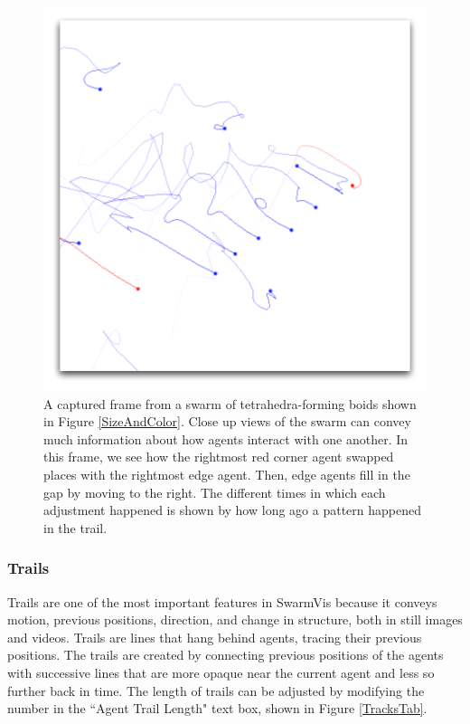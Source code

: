 \documentclass[conference]{IEEEtran}
\begin{document}
\begin{figure}
\centering
\includegraphics[scale=.5]{images/closeuptrails.pdf}
\caption{
A captured frame from a swarm of tetrahedra-forming boids shown in Figure \ref{SizeAndColor}.
Close up views of the swarm can convey much information about how agents interact with one another.
In this frame, we see how the rightmost red corner agent swapped places with the rightmost edge agent.
Then, edge agents fill in the gap by moving to the right. The different times in which each adjustment happened
is shown by how long ago a pattern happened in the trail.}
\label{CloseTrails}
\end{figure}

\subsubsection{Trails}

Trails are one of the most important features in SwarmVis because it conveys motion, previous positions, direction,
and change in structure, both in still images and videos. Trails are lines that hang behind agents, tracing
their previous positions. 
The trails are created by connecting previous positions of the agents with
successive lines that are more opaque near the current agent and less so further back in time.
The length of trails can be adjusted by modifying the number in the ``Agent Trail Length" text box, shown in
Figure \ref{TracksTab}.
\end{document}
